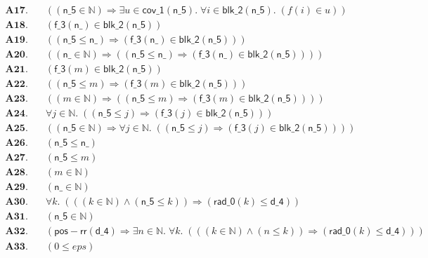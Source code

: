 \documentclass[11pt]{article}
\begin{document}
\begin{align*}
  \mathbf{A17.}\quad & ((\mathsf{n\_5} \in \mathbb{N}) \Rightarrow \exists u \in \mathsf{cov\_1}(\mathsf{n\_5}).\; \forall i \in \mathsf{blk\_2}(\mathsf{n\_5}).\; (f(i) \in u)) \\
  \mathbf{A18.}\quad & (\mathsf{f\_3}(\mathsf{n\_}) \in \mathsf{blk\_2}(\mathsf{n\_5})) \\
  \mathbf{A19.}\quad & ((\mathsf{n\_5} \leq \mathsf{n\_}) \Rightarrow (\mathsf{f\_3}(\mathsf{n\_}) \in \mathsf{blk\_2}(\mathsf{n\_5}))) \\
  \mathbf{A20.}\quad & ((\mathsf{n\_} \in \mathbb{N}) \Rightarrow ((\mathsf{n\_5} \leq \mathsf{n\_}) \Rightarrow (\mathsf{f\_3}(\mathsf{n\_}) \in \mathsf{blk\_2}(\mathsf{n\_5})))) \\
  \mathbf{A21.}\quad & (\mathsf{f\_3}(m) \in \mathsf{blk\_2}(\mathsf{n\_5})) \\
  \mathbf{A22.}\quad & ((\mathsf{n\_5} \leq m) \Rightarrow (\mathsf{f\_3}(m) \in \mathsf{blk\_2}(\mathsf{n\_5}))) \\
  \mathbf{A23.}\quad & ((m \in \mathbb{N}) \Rightarrow ((\mathsf{n\_5} \leq m) \Rightarrow (\mathsf{f\_3}(m) \in \mathsf{blk\_2}(\mathsf{n\_5})))) \\
  \mathbf{A24.}\quad & \forall j \in \mathbb{N}.\; ((\mathsf{n\_5} \leq j) \Rightarrow (\mathsf{f\_3}(j) \in \mathsf{blk\_2}(\mathsf{n\_5}))) \\
  \mathbf{A25.}\quad & ((\mathsf{n\_5} \in \mathbb{N}) \Rightarrow \forall j \in \mathbb{N}.\; ((\mathsf{n\_5} \leq j) \Rightarrow (\mathsf{f\_3}(j) \in \mathsf{blk\_2}(\mathsf{n\_5})))) \\
  \mathbf{A26.}\quad & (\mathsf{n\_5} \leq \mathsf{n\_}) \\
  \mathbf{A27.}\quad & (\mathsf{n\_5} \leq m) \\
  \mathbf{A28.}\quad & (m \in \mathbb{N}) \\
  \mathbf{A29.}\quad & (\mathsf{n\_} \in \mathbb{N}) \\
  \mathbf{A30.}\quad & \forall k.\; (((k \in \mathbb{N}) \wedge (\mathsf{n\_5} \leq k)) \Rightarrow (\mathsf{rad\_0}(k) \leq \mathsf{d\_4})) \\
  \mathbf{A31.}\quad & (\mathsf{n\_5} \in \mathbb{N}) \\
  \mathbf{A32.}\quad & (\mathsf{pos{-}rr}(\mathsf{d\_4}) \Rightarrow \exists n \in \mathbb{N}.\; \forall k.\; (((k \in \mathbb{N}) \wedge (n \leq k)) \Rightarrow (\mathsf{rad\_0}(k) \leq \mathsf{d\_4}))) \\
  \mathbf{A33.}\quad & (0 \leq \mathit{eps}) \\

\end{align*}
\end{document}
